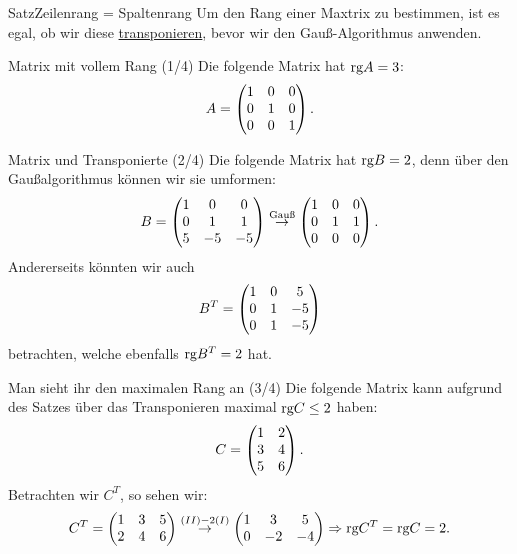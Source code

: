 \begin{Satz}
{Satz}{Zeilenrang {=} Spaltenrang}
Um den Rang einer Maxtrix zu bestimmen, ist es egal, ob wir diese \underline{transponieren}, bevor wir den Gauß-Algorithmus anwenden.
\end{Satz}
\begin{Beispiel}{Matrix mit vollem Rang (1/4)}
Die folgende Matrix hat $\text{rg} A=3$:
\begin{equation*}
    A=\begin{pmatrix}1&0&0\\0&1&0\\0&0&1\end{pmatrix}.
\end{equation*}
\end{Beispiel}
\begin{Beispiel}{Matrix und Transponierte (2/4)}
Die folgende Matrix hat $\text{rg} B= 2$, denn über den Gaußalgorithmus können wir sie umformen:
\begin{equation*}
    B=\begin{pmatrix}1&0&0\\0&1&1\\5&-5&-5\end{pmatrix}\overset{\text{Gauß}}{\rightarrow}\begin{pmatrix}1&0&0\\0&1&1\\0&0&0\end{pmatrix}.
\end{equation*}
Andererseits könnten wir auch
\begin{equation*}
    B^T=\begin{pmatrix}1&0&5\\0&1&-5\\0&1&-5\end{pmatrix}
\end{equation*}
betrachten, welche ebenfalls $\text{rg} B^T=2$ hat.
\end{Beispiel}
\begin{Beispiel}
{Man sieht ihr den maximalen Rang an (3/4)}
Die folgende Matrix kann aufgrund des Satzes über das Transponieren maximal $\text{rg} C\leq 2$ haben:
\begin{equation*}
    C=\begin{pmatrix}1&2\\3&4\\5&6\end{pmatrix}.
\end{equation*}
Betrachten wir $C^T$, so sehen wir:
\begin{equation*}
    C^T=\begin{pmatrix}1&3&5\\2&4&6\end{pmatrix}\overset{(II)-2(I)}{\to}\begin{pmatrix}1&3&5\\0&-2&-4\end{pmatrix}\Rightarrow\text{rg} C^T=\text{rg} C=2.
\end{equation*}
\end{Beispiel}
